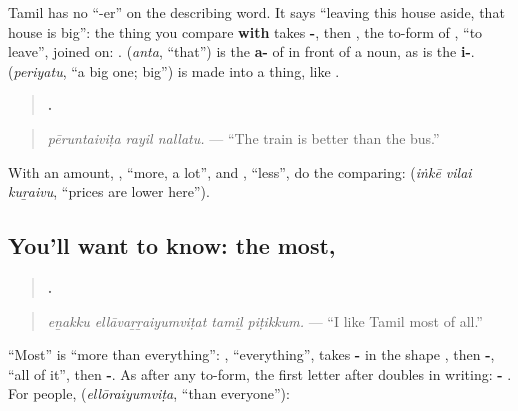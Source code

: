 Tamil has no \textquotedblleft{}-er\textquotedblright{} on the describing word. It says \textquotedblleft{}leaving this house aside, that house is big\textquotedblright{}: the thing you compare \textbf{with} takes \textbf{-}, then \textbf{}, the to-form of \textbf{}, \textquotedblleft{}to leave\textquotedblright{}, joined on: \textbf{}. \textbf{} (\emph{anta}, \textquotedblleft{}that\textquotedblright{}) is the \textbf{a-} of \textbf{} in front of a noun, as \textbf{} is the \textbf{i-}. \textbf{} (\emph{periyatu}, \textquotedblleft{}a big one; big\textquotedblright{}) is \textbf{} made into a thing, like \textbf{}.

\begin{quote}
\textbf{  .}
\end{quote}

\begin{quote}
\emph{pēruntaiviṭa rayil nallatu.} — \textquotedblleft{}The train is better than the bus.\textquotedblright{}
\end{quote}

With an amount, \textbf{}, \textquotedblleft{}more, a lot\textquotedblright{}, and \textbf{}, \textquotedblleft{}less\textquotedblright{}, do the comparing: \textbf{  } (\emph{iṅkē vilai kuṟaivu}, \textquotedblleft{}prices are lower here\textquotedblright{}).

\subsection*{You'll want to know: the most, }
\begin{quote}
\textbf{   .}
\end{quote}

\begin{quote}
\emph{eṉakku ellāvaṟṟaiyumviṭat tamiḻ piṭikkum.} — \textquotedblleft{}I like Tamil most of all.\textquotedblright{}
\end{quote}

\textquotedblleft{}Most\textquotedblright{} is \textquotedblleft{}more than everything\textquotedblright{}: \textbf{}, \textquotedblleft{}everything\textquotedblright{}, takes \textbf{-} in the shape \textbf{}, then \textbf{-}, \textquotedblleft{}all of it\textquotedblright{}, then \textbf{-}. As after any to-form, the first letter after \textbf{} doubles in writing: \textbf{- }. For people, \textbf{} (\emph{ellōraiyumviṭa}, \textquotedblleft{}than everyone\textquotedblright{}):

